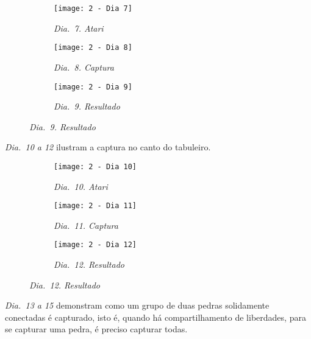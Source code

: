 \begin{figure}[h]
    \centering
    \begin{subfigure}{.3\textwidth}
        \centering
        \texttt{[image: 2 - Dia 7]}
        \captionsetup{justification=centering}
        \caption*{\emph{Dia.\@~7. Atari}}
    \end{subfigure}
    \begin{subfigure}{.3\textwidth}
        \centering
        \texttt{[image: 2 - Dia 8]}
        \captionsetup{justification=centering}
        \caption*{\emph{Dia.\@~8. Captura}}
    \end{subfigure}
    \begin{subfigure}{.3\textwidth}
        \centering
        \texttt{[image: 2 - Dia 9]}
        \captionsetup{justification=centering}
        \caption*{\emph{Dia.\@~9. Resultado}}
    \end{subfigure}
\end{figure}

\emph{Dia.\@~10 a 12} ilustram a captura no canto do tabuleiro.

\begin{figure}[h]
    \centering
    \begin{subfigure}{.3\textwidth}
        \centering
        \texttt{[image: 2 - Dia 10]}
        \captionsetup{justification=centering}
        \caption*{\emph{Dia.\@~10. Atari}}
    \end{subfigure}
    \begin{subfigure}{.3\textwidth}
        \centering
        \texttt{[image: 2 - Dia 11]}
        \captionsetup{justification=centering}
        \caption*{\emph{Dia.\@~11. Captura}}
    \end{subfigure}
    \begin{subfigure}{.3\textwidth}
        \centering
        \texttt{[image: 2 - Dia 12]}
        \captionsetup{justification=centering}
        \caption*{\emph{Dia.\@~12. Resultado}}
    \end{subfigure}
\end{figure}

\pagebreak

\emph{Dia.\@~13 a 15} demonstram  como um grupo de duas pedras solidamente conectadas é capturado, isto é, quando há compartilhamento de liberdades, para se capturar uma pedra, é preciso capturar todas.

